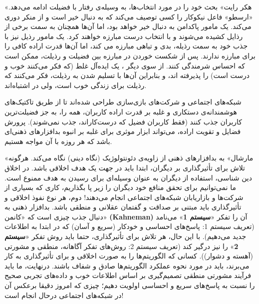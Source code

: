 «هکر رایت» بحث خود را در مورد انتخاب‌ها، به وسیله‌ی رفتار با فضیلت ادامه می‌دهد.
«ارسطو» فاعل نیکوکار را کسی توصیف می‌کند که به دنبال خیر است و از منکر دوری می‌کند.
یک مامور پاکدامن به دنبال خیر خواهد بود، اما آن‌ها همچنان به سمت برخی از رذایل کشیده می‌شوند و با انتخاب درست مبارزه خواهند کرد.
یک مامور رذیل نیز با جذب خود به سمت رذیله، بدی و تباهی مبارزه می کند، اما آن‌ها قدرت اراده کافی را برای مبارزه ندارند.
پس از شکست خوردن در مبارزه بین فضیلت و رذیلت، ممکن است که احساس شرمندگی کنند.
از سوی دیگر ، یک ایده‌آل غلط (که فکر می‌کنند خوب و درست است) را پذیرفته اند، و بنابراین آن‌ها با تسلیم شدن به رذیلت، فکر می‌کنند که رذیلت برای زندگی خوب است، ولی در اشتباه‌اند.

شبکه‌های اجتماعی و شرکت‌های بازی‌سازی طراحی شده‌اند تا از طریق تاکتیک‌های هوشمندانه‌ی دستکاری و غلبه بر قدرت اراده کاربران، همه را، به جز فضیلت‌ترین کاربران جذب کنند (فقط کاربران فضیل که درست‌کاراند، جذب نمی‌شوند).
پرورش فضایل و تقویت اراده، می‌تواند ابزار موثری برای غلبه بر انبوه بدافزارهای ذهنی‌ای باشد که هر روزه با آن مواجه هستیم.

«مارشال» به بدافزارهای ذهنی از زاویه‌ی دئونتولوژیک (نگاه دینی) نگاه می‌کند.
هرگونه تلاش برای تأثیرگذاری بر دیگران، ابتدا باید در جهت یک هدف اخلاقی باشد.
در اخلاق دین شناسی، استفاده از دیگران به عنوان وسیله‌ای برای رسیدن به هدف ممنوع است.
ما نمی‌توانیم برای تحقق منافع خود دیگران را زیر پا بگذاریم، کاری که بسیاری از شرکت‌ها و بازاریابان شبکه‌های اجتماعی انجام می‌دهند!
دوم، هر نوع نفوذ اخلاقی و تأثیرگذاری باید مبتنی بر صداقت و گفتمان عقلانی و منطقی باشد.
بدافزار ذهنی به دنبال جذب چیزی است که «کانمن» \textenglish{\textbf{(Kahneman)}} آن را تفکر «\textbf{سیستم 1}» می‌نامد (تعریف سیستم 1: پاسخ‌های احساسی و خودکار (سریع و آسان) که در ابتدا به اطلاعات جدید می‌دهیم).
با این حال، هر تلاش برای تأثیرگذاری، حتما باید روش تفکر «\textbf{سیستم 2}» را نیز درگیر کند (تعریف سیستم 2: روش‌های تفکر آگاهانه، منطقی و مشورتی (آهسته و دشوار)).
کسانی که الگوریتم‌ها را به صورت اخلاقی و برای تأثیرگذاری به کار می‌برند، باید در مورد نحوه عملکرد الگوریتم‌ها صادق و شفاف باشند.
درنهایت، ما باید فرآیند مشورتی منطقی تصمیم‌گیری بر اساس اطلاعات خوب و داده‌های تجربی صحیح را نسبت به پاسخ‌های سریع و احساسی اولویت دهیم؛ چیزی که امروز دقیقا برعکس آن در شبکه‌های اجتماعی درحال انجام است!

